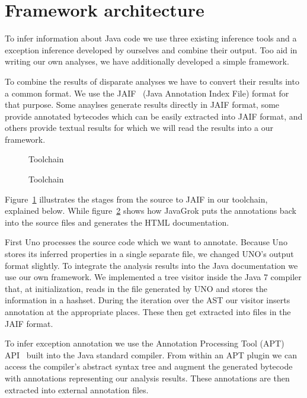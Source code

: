 \section{Framework architecture}
To infer information about Java code we use three existing inference tools and 
a exception inference developed by ourselves and combine their output. 
Too aid in writing our own analyses, we have additionally developed a simple 
framework. 

To combine the results of disparate analyses we have to convert their results
into a common format.  We use the JAIF~\cite{JAIF}
(Java Annotation Index File) format for that purpose.  Some anaylses generate
results directly in JAIF format, some provide annotated bytecodes which can be
easily extracted into JAIF format, and others provide textual results for which
we will read the results into a our framework.

\begin{figure}
\centering
{}
\caption{Toolchain}
\label{fig:from_source_to_jaif}
\end{figure}

\begin{figure}
\centering
{}
\caption{Toolchain}
\label{fig:from_jaif_to_javadoc}
\end{figure}

Figure~\ref{fig:from_source_to_jaif} 
illustrates the stages from the source to JAIF in our toolchain, explained 
below. While figure~\ref{fig:from_jaif_to_javadoc} shows how JavaGrok
puts the annotations back into the source files and generates the HTML
documentation.

First Uno processes the source code which we want to annotate. 
Because Uno stores its inferred properties in a single separate file, 
we changed UNO's output format slightly.
To integrate the analysis results into the Java documentation we
use our own framework. We implemented a tree visitor inside the Java 7 
compiler that, at initialization, reads in the file generated by UNO and 
stores the information in a hashset. During the iteration over the AST
our visitor inserts annotation at the appropriate places. These then
get extracted into files in the JAIF format.

To infer exception annotation we use the Annotation Processing Tool (APT)
API~\cite{apt} built into the Java standard compiler.
From within an APT plugin
we can access the compiler's abstract syntax tree and augment the generated
bytecode with annotations representing our analysis results. These annotations
are then extracted into external annotation files.

